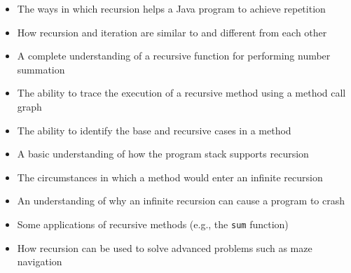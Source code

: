 \documentclass[11pt]{article}
\begin{document}
\begin{itemize}

  \itemsep 0in

  \item The ways in which recursion helps a Java program to achieve repetition
  \item How recursion and iteration are similar to and different from each other
  \item A complete understanding of a recursive function for performing number summation
  \item The ability to trace the execution of a recursive method using a method call graph
  \item The ability to identify the base and recursive cases in a method
  \item A basic understanding of how the program stack supports recursion
  \item The circumstances in which a method would enter an infinite recursion
  \item An understanding of why an infinite recursion can cause a program to crash
  \item Some applications of recursive methods (e.g., the {\tt sum} function)
  \item How recursion can be used to solve advanced problems such as maze navigation

\end{itemize}
\end{document}
